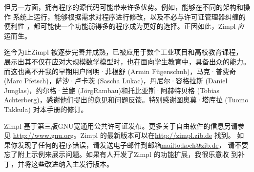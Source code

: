 \documentclass[11pt]{ctexart} %
\newcommand{\zimpl}{{\sc Zimpl}\xspace}
\begin{document}
但另一方面，拥有程序的源代码可能带来许多优势。例如，能够在不同的架构和操作
系统上运行，能够根据需求对程序进行修改，以及不必与许可证管理器纠缠的便利性
，都可能使一个功能弱得多的程序成为更好的选择。正因如此，\zimpl 应运而生。

\bigskip
迄今为止\zimpl 被逐步完善并成熟，已被应用于数个工业项目和高校教育课程，
展示出其不仅在应对大规模数学模型时，也在面向学生教育中，具备出众的能力。
而这也离不开我的早期用户阿明·菲根舒 (Armin F\"ugenschuh)，马克·普费奇 
(Marc Pfetsch)，萨沙·卢卡茨 (Sascha Lukac)，丹尼尔·容格拉斯 (Daniel
Junglas)，约尔格·兰鲍 (J\"orgRambau)和托比亚斯·阿赫特贝格 (Tobias
Achterberg)，感谢他们提出的意见和问题反馈。特别感谢图奥莫·塔库拉 (Tuomo
Takkula) 对本手册的修订。

\bigskip
\zimpl 基于第三版GNU宽通用公共许可证发布。更多关于自由软件的信息另请参见
\url{http://www.gnu.org}。\zimpl 的最新版本可以在\url{http://zimpl.zib.de}
找到。
如果你发现了任何的程序错误，请发送电子邮件到邮箱\url{mailto:koch@zib.de}，
请不要忘了附上示例来展示问题。如果有人开发了\zimpl 的功能扩展，我很乐意收
到补丁，并将这些改进纳入主发行版本。
\end{document}
